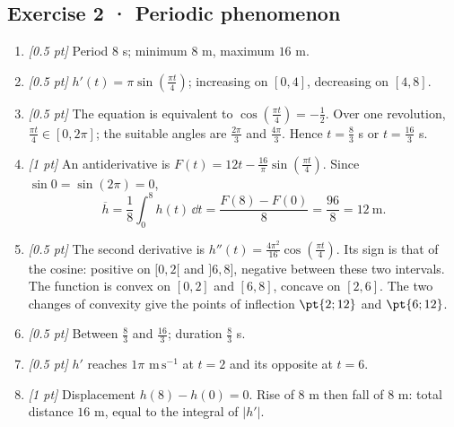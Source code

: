 \subsection*{Exercise 2 · Periodic phenomenon}\begin{enumerate}

\item \textit{[0.5 pt]} Period $8$ s; minimum $8$ m, maximum $16$ m.

\item \textit{[0.5 pt]} $h'(t)=\pi\sin (\frac{\pi t}{4})$; increasing on $[0,4]$, decreasing on $[4,8]$.

\item \textit{[0.5 pt]} The equation is equivalent to $\cos (\frac{\pi t}{4})=-\frac{1}{2}$. Over one revolution, $\frac{\pi t}{4}\in[0,2\pi]$; the suitable angles are $\frac{2\pi}{3}$ and $\frac{4\pi}{3}$. Hence $t=\frac{8}{3}$ s or $t=\frac{16}{3}$ s.

\item \textit{[1 pt]} An antiderivative is $F(t)=12t-\frac{16}{\pi}\sin (\frac{\pi t}{4})$. Since $\sin0=\sin(2\pi)=0$,
\[\overline h=\frac{1}{8}\int_0^{8}h(t)\,\dd t=\frac{F(8)-F(0)}{8}=\frac{96}{8}=12\ \mathrm{m}.\]

\item \textit{[0.5 pt]} The second derivative is $h''(t)=\frac{4\pi^2}{16}\cos (\frac{\pi t}{4})$. Its sign is that of the cosine: positive on $[0,2[$ and $]6,8]$, negative between these two intervals. The function is convex on $[0,2]$ and $[6,8]$, concave on $[2,6]$. The two changes of convexity give the points of inflection $\pt{2;12}$ and $\pt{6;12}$.

\item \textit{[0.5 pt]} Between $\frac{8}{3}$ and $\frac{16}{3}$; duration $\frac{8}{3}$ s.

\item \textit{[0.5 pt]} $h'$ reaches $1\pi$ $\mathrm{m\,s^{-1}}$ at $t=2$ and its opposite at $t=6$.

\item \textit{[1 pt]} Displacement $h(8)-h(0)=0$. Rise of $8$ m then fall of $8$ m: total distance $16$ m, equal to the integral of $|h'|$.

\end{enumerate}

